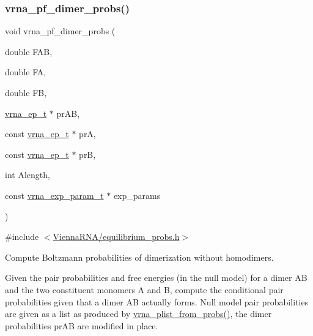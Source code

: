 \subsubsection{\texorpdfstring{vrna\+\_\+pf\+\_\+dimer\+\_\+probs()}{vrna\_pf\_dimer\_probs()}}
{\footnotesize\ttfamily void vrna\+\_\+pf\+\_\+dimer\+\_\+probs (\begin{DoxyParamCaption}\item[{double}]{F\+AB,  }\item[{double}]{FA,  }\item[{double}]{FB,  }\item[{\hyperlink{group__struct__utils__plist_gab9ac98ab55ded9fb90043b024b915aca}{vrna\+\_\+ep\+\_\+t} $\ast$}]{pr\+AB,  }\item[{const \hyperlink{group__struct__utils__plist_gab9ac98ab55ded9fb90043b024b915aca}{vrna\+\_\+ep\+\_\+t} $\ast$}]{prA,  }\item[{const \hyperlink{group__struct__utils__plist_gab9ac98ab55ded9fb90043b024b915aca}{vrna\+\_\+ep\+\_\+t} $\ast$}]{prB,  }\item[{int}]{Alength,  }\item[{const \hyperlink{group__energy__parameters_ga01d8b92fe734df8d79a6169482c7d8d8}{vrna\+\_\+exp\+\_\+param\+\_\+t} $\ast$}]{exp\+\_\+params }\end{DoxyParamCaption})}



{\ttfamily \#include $<$\hyperlink{equilibrium__probs_8h}{Vienna\+R\+N\+A/equilibrium\+\_\+probs.\+h}$>$}



Compute Boltzmann probabilities of dimerization without homodimers. 

Given the pair probabilities and free energies (in the null model) for a dimer AB and the two constituent monomers A and B, compute the conditional pair probabilities given that a dimer AB actually forms. Null model pair probabilities are given as a list as produced by \hyperlink{group__part__func__global_ga94f6efc0b8d8712b023452794a0a5bd2}{vrna\+\_\+plist\+\_\+from\+\_\+probs()}, the dimer probabilities \textquotesingle{}pr\+AB\textquotesingle{} are modified in place.


